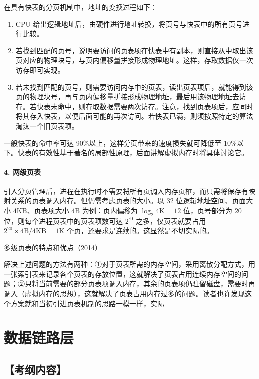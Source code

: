 \documentclass{ctexbook}
\begin{document}
	在具有快表的分页机制中，地址的变换过程如下：
	\begin{enumerate}
		\item CPU 给出逻辑地址后，由硬件进行地址转换，将页号与快表中的所有页号进行比较。
		\item 若找到匹配的页号，说明要访问的页表项在快表中有副本，则直接从中取出该页对应的物理块号，与页内偏移量拼接形成物理地址。这样，存取数据仅一次访存即可实现。
		\item 若未找到匹配的页号，则需要访问内存中的页表，读出页表项后，就能得到该页的物理块号，再与页内偏移量拼接形成物理地址，最后用该物理地址去访存。若快表未命中，则存取数据需要两次访存。注意，找到页表项后，应同时将其存入快表，以便后面可能的再次访问。若快表已满，则须按照特定的算法淘汰一个旧页表项。
	\end{enumerate}
	
	一般快表的命中率可达 90\%以上，这样分页带来的速度损失就可降低至 10\%以下。快表的有效性基于著名的局部性原理，后面讲解虚拟内存时将具体讨论它。
	
	\subsubsection{4. 两级页表}
	引入分页管理后，进程在执行时不需要将所有页调入内存页框，而只需将保存有映射关系的页表调入内存。但仍需考虑页表的大小。以 32 位逻辑地址空间、页面大小 \( 4\text{KB} \)、页表项大小 \( 4\text{B} \) 为例：页内偏移为 \( \log_2 4\text{K} = 12 \) 位，页号部分为 \( 20 \) 位，则每个进程页表中的页表项数可达 \( 2^{20} \) 之多，仅页表就要占用 \( 2^{20} \times 4\text{B} / 4\text{KB} = 1\text{K} \) 个页，还要求是连续的。这显然是不切实际的。
	
	\begin{tcolorbox}[colback=gray!10, colframe=gray!30, title={命题追踪}]
		多级页表的特点和优点（2014）
	\end{tcolorbox}
	
	解决上述问题的方法有两种：①对于页表所需的内存空间，采用离散分配方式，用一张索引表来记录各个页表的存放位置，这就解决了页表占用连续内存空间的问题；②只将当前需要的部分页表项调入内存，其余的页表项仍驻留磁盘，需要时再调入（虚拟内存的思想），这就解决了页表占用内存过多的问题。读者也许发现这个方案就和当初引进页表机制的思路一模一样，实际
	
	
	
	\chapter{数据链路层}
	
	\section*{【考纲内容】}
	
\end{document}
